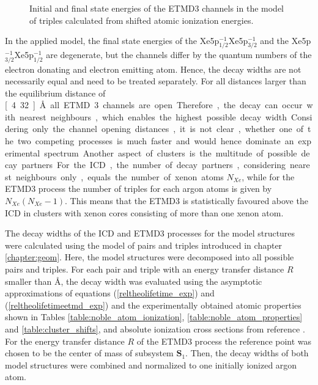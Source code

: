\begin{figure}[htb]
 \centering
 
 \caption{Initial and final state energies of the \ac{ETMD}3 channels
          in the model of triples calculated from shifted atomic ionization
          energies.}
 \label{figure:ArXe_energy_etmd_curves}
\end{figure}

In the applied model, the final state energies of the
Xe5p$_{1/2}^{-1}$Xe5p$_{3/2}^{-1}$ and
the Xe5p$_{3/2}^{-1}$Xe5p$_{1/2}^{-1}$ are degenerate, but the channels
differ by the quantum
numbers of the electron donating and electron emitting atom. Hence, the decay
widths are not necessarily equal and need to be treated separately.
For all distances larger than the equilibrium distance of \unit[4.32]{\AA}
all \ac{ETMD}3 channels are open. Therefore, the decay can occur with
nearest neighbours, which enables the highest possible decay width.

Considering only the channel opening distances, it is not clear, whether
one of the two competing processes is much faster and would hence dominate
an experimental spectrum. Another aspect of clusters is the multitude of
possible decay partners. For the \ac{ICD}, the number of decay partners,
considering nearest neighbours only, equals
the number of xenon atoms $N_{Xe}$, while for the \ac{ETMD}3 process the number
of triples for each argon atoms is given by $N_{Xe}(N_{Xe}-1)$. This means that
the \ac{ETMD}3 is statistically favoured above the \ac{ICD} in clusters with
xenon cores consisting of more than one xenon atom.

The decay widths of the \ac{ICD} and \ac{ETMD}3 processes for the model
structures were calculated using the model of pairs and triples introduced in
chapter \ref{chapter:geom}. Here, the model structures were decomposed
into all possible pairs and triples. For each pair and triple with an energy
transfer distance $R$ smaller than \unit[11]{\AA}, the decay width was evaluated
using
the asymptotic approximations of equations
(\ref{reltheolifetime_exp}) and (\ref{reltheolifetimeetmd_exp}) and the
experimentally obtained atomic properties shown in Tables
\ref{table:noble_atom_ionization}, \ref{table:noble_atom_properties} and
\ref{table:cluster_shifts}, and absolute ionization cross sections from reference
\cite{West78}. For the energy transfer distance $R$ of the \ac{ETMD}3 process
the reference point was chosen to be the center of mass of
subsystem $\mathbf{S}_1$. 
Then, the decay widths of both model structures were combined and normalized
to one initially ionized argon atom.

